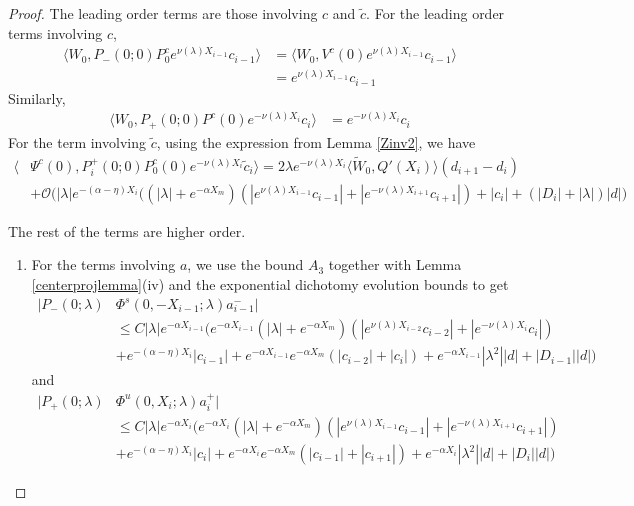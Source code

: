 \documentclass[thesis.tex]{subfiles}
\begin{document}
\begin{lemma}
\begin{proof}
The leading order terms are those involving $c$ and $\tilde{c}$. For the leading order terms involving $c$, 
\begin{align*}
\langle W_0, P_-(0; 0) P_0^c e^{\nu(\lambda) X_{i-1}} c_{i-1} \rangle &= \langle W_0, V^c(0) e^{\nu(\lambda) X_{i-1}} c_{i-1} \rangle \\
&= e^{\nu(\lambda) X_{i-1}} c_{i-1}
\end{align*}
Similarly,
\begin{align*}
\langle W_0, P_+(0; 0) P^c(0) e^{-\nu(\lambda) X_i} c_i \rangle &= e^{-\nu(\lambda) X_i} c_i 
\end{align*}
For the term involving $\tilde{c}$, using the expression from Lemma \ref{Zinv2}, we have
\begin{align*}
\langle &\Psi^c(0), P_i^+(0; 0) P_0^c(0) e^{-\nu(\lambda)X_i} \tilde{c}_i \rangle
= 2 \lambda e^{-\nu(\lambda)X_i} \langle \tilde{W}_0, Q'(X_i) \rangle (d_{i+1} - d_i ) \\
&+ \mathcal{O}\Big( |\lambda| e^{-(\alpha - \eta) X_i} \Big( (|\lambda| + e^{-\alpha X_m})(|e^{\nu(\lambda)X_{i-1}} c_{i-1}| + |e^{-\nu(\lambda)X_{i+1}}c_{i+1}|) + |c_i| + (|D_i| + |\lambda|)|d| \Big)
\end{align*}

The rest of the terms are higher order.
\begin{enumerate}

\item For the terms involving $a$, we use the bound $A_3$ together with Lemma \ref{centerprojlemma}(iv) and the exponential dichotomy evolution bounds to get
\begin{align*}
|P_-(0; \lambda) &\Phi^s(0, -X_{i-1}; \lambda) a_{i-1}^-| \\
&\leq C |\lambda| e^{-\alpha X_{i-1}} \Big(  
e^{-\alpha X_{i-1}} (|\lambda| + e^{-\alpha X_m})(|e^{\nu(\lambda)X_{i-2}} c_{i-2}| + |e^{-\nu(\lambda)X_i} c_i |) \\
&+ e^{-(\alpha - \eta)X_i}|c_{i-1}| + e^{-\alpha X_{i-1}} e^{-\alpha X_m}(|c_{i-2}| + |c_i|) + e^{-\alpha X_{i-1}} |\lambda^2||d| + |D_{i-1}||d| \Big)
\end{align*} 
and
\begin{align*}
|P_+(0; \lambda) &\Phi^u(0, X_i; \lambda) a_i^+| \\
&\leq C |\lambda| e^{-\alpha X_i} \Big( e^{-\alpha X_i} (|\lambda| + e^{-\alpha X_m})(|e^{\nu(\lambda)X_{i-1}} c_{i-1}| + |e^{-\nu(\lambda)X_{i+1}}c_{i+1}|) \\
&+ e^{-(\alpha - \eta)X_i}|c_i| + e^{-\alpha X_i} e^{-\alpha X_m}(|c_{i-1}| + |c_{i+1}|) + e^{-\alpha X_i} |\lambda^2||d| + |D_i||d| \Big)
\end{align*}


\end{enumerate}
\end{proof}
\end{lemma}
\end{document}
